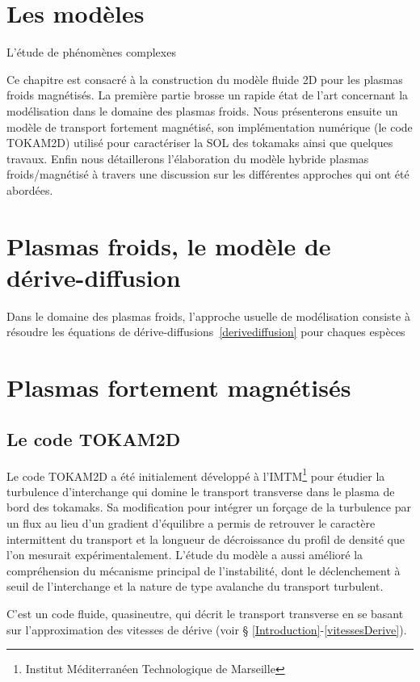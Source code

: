  	\section{Les modèles}
L'étude de phénomènes complexes
 	
Ce chapitre est consacré à la construction du modèle fluide 2D pour les plasmas
froids magnétisés.
La première partie brosse un rapide état de l'art concernant la modélisation
dans le domaine des plasmas froids. Nous présenterons ensuite un modèle de
transport fortement magnétisé, son implémentation numérique (le code TOKAM2D)
utilisé pour caractériser la SOL des tokamaks ainsi que quelques travaux. Enfin
nous détaillerons l'élaboration du modèle hybride plasmas froids/magnétisé à
travers une discussion sur les différentes approches qui ont été abordées.
	
	\section{Plasmas froids, le modèle de dérive-diffusion}
Dans le domaine des plasmas froids, l'approche usuelle de modélisation consiste
à résoudre les équations de dérive-diffusions~\eqref{derivediffusion} pour
chaques espèces
	\section{Plasmas fortement magnétisés}
	 \subsection{Le code TOKAM2D}
Le code TOKAM2D a été initialement développé à l'IMTM\footnote{Institut
Méditerranéen Technologique de Marseille} pour étudier la turbulence
d'interchange qui domine le transport transverse dans le plasma de bord des
tokamaks. Sa modification pour intégrer un forçage de la turbulence par un flux
au lieu d'un gradient d'équilibre a permis de retrouver le caractère
intermittent du transport et la longueur de décroissance du profil de densité
que l'on mesurait expérimentalement. L'étude du modèle a aussi amélioré la
compréhension du mécanisme principal de l'instabilité, dont le déclenchement à
seuil de l'interchange et la nature de type avalanche du transport turbulent.

C'est un code fluide, quasineutre, qui décrit le transport transverse en se
basant sur l'approximation des vitesses de dérive (voir §
\ref{Introduction}-\ref{vitessesDerive}).
